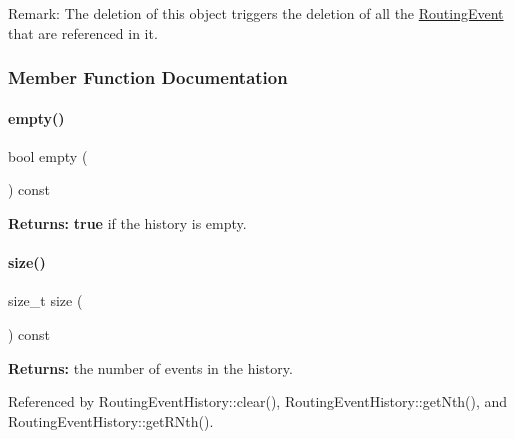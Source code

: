 \begin{DoxyParagraph}{Remark\+:}
The deletion of this object triggers the deletion of all the \hyperlink{classKite_1_1RoutingEvent}{Routing\+Event} that are referenced in it. 
\end{DoxyParagraph}


\subsubsection{Member Function Documentation}
\mbox{\label{classKite_1_1RoutingEventHistory_a644718bb2fb240de962dc3c9a1fdf0dc}} 
\paragraph{\texorpdfstring{empty()}{empty()}}
{\footnotesize\ttfamily bool empty (\begin{DoxyParamCaption}{ }\end{DoxyParamCaption}) const\hspace{0.3cm}{\ttfamily [inline]}}

{\bfseries Returns\+:} {\bfseries true} if the history is empty. \mbox{\label{classKite_1_1RoutingEventHistory_a259cb5a711406a8c3e5d937eb9350cca}} 
\paragraph{\texorpdfstring{size()}{size()}}
{\footnotesize\ttfamily size\+\_\+t size (\begin{DoxyParamCaption}{ }\end{DoxyParamCaption}) const\hspace{0.3cm}{\ttfamily [inline]}}

{\bfseries Returns\+:} the number of events in the history. 

Referenced by Routing\+Event\+History\+::clear(), Routing\+Event\+History\+::get\+Nth(), and Routing\+Event\+History\+::get\+R\+Nth().

\mbox{\label{classKite_1_1RoutingEventHistory_a81fbd6a845cb991db9f03f13edb14a50}} 
